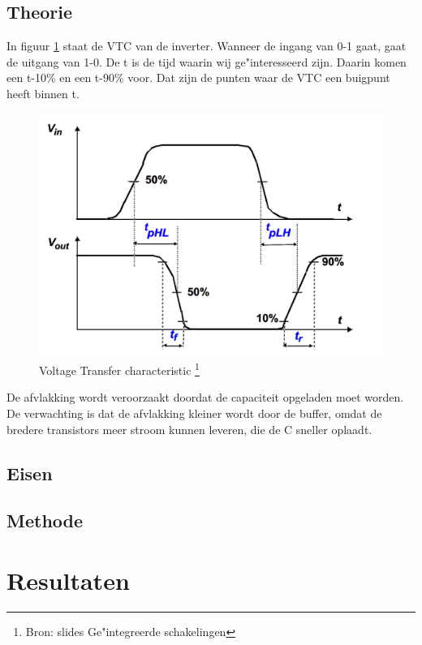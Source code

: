 \documentclass{report}
\begin{document}
\section{Theorie}
In figuur \ref{T1} staat de VTC van de inverter. Wanneer de ingang van 0-1 gaat, gaat de uitgang van 1-0. De t is de tijd waarin wij ge"interesseerd zijn. Daarin komen een t-10\% en een t-90\% voor. Dat zijn de punten waar de VTC een buigpunt heeft binnen t. 
\begin{figure} [h!]
\includegraphics [scale= 0.3] {inputfiles/vtc}
\caption{Voltage Transfer characteristic \footnote{Bron: slides Ge"integreerde schakelingen}}
\label{T1}
\end{figure}
De afvlakking wordt veroorzaakt doordat de capaciteit opgeladen moet worden. De verwachting is dat de afvlakking kleiner wordt door de buffer, omdat de bredere transistors meer stroom kunnen leveren, die de C sneller oplaadt. 



\section{Eisen}


\section{Methode}
%

\chapter{Resultaten}
%
\end{document}
